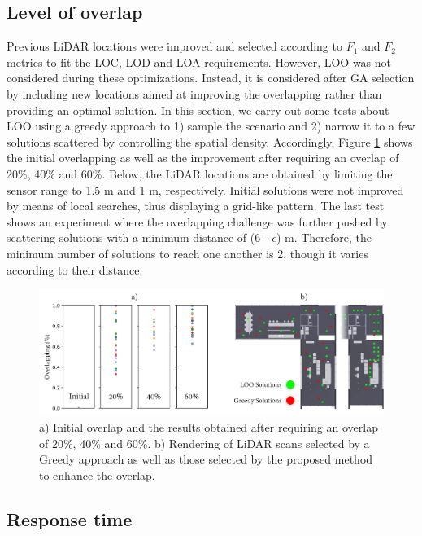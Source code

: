 \subsection{Level of overlap}

Previous LiDAR locations were improved and selected according to $F_1$ and $F_2$ metrics to fit the LOC, LOD and LOA requirements. However, LOO was not considered during these optimizations. Instead, it is considered after GA selection by including new locations aimed at improving the overlapping rather than providing an optimal solution. In this section, we carry out some tests about LOO using a greedy approach to 1) sample the scenario and 2) narrow it to a few solutions scattered by controlling the spatial density. Accordingly, Figure \ref{fig:loo_results} shows the initial overlapping as well as the improvement after requiring an overlap of 20\%, 40\% and 60\%. Below, the LiDAR locations are obtained by limiting the sensor range to 1.5 \si{\meter} and 1 \si{\meter}, respectively. Initial solutions were not improved by means of local searches, thus displaying a grid-like pattern. The last test shows an experiment where the overlapping challenge was further pushed by scattering solutions with a minimum distance of (6 - $\epsilon$) \si{\meter}. Therefore, the minimum number of solutions to reach one another is 2, though it varies according to their distance. 

\begin{figure}
    \centering
    \includegraphics[width=\linewidth]{figs/lidar_optimization/loo_results.png}
	\caption{a) Initial overlap and the results obtained after requiring an overlap of 20\%, 40\% and 60\%. b) Rendering of LiDAR scans selected by a Greedy approach as well as those selected by the proposed method to enhance the overlap. }
	\label{fig:loo_results}
\end{figure}

\subsection{Response time}

